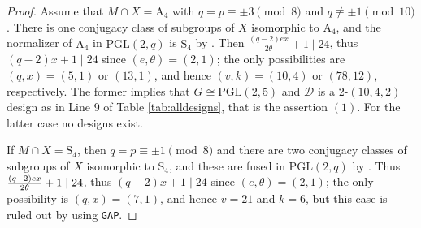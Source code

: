 \documentclass[a4paper,twopage,reqno,12pt]{amsart}
\theoremstyle{definition}
\numberwithin{equation}{section}
\newcommand{\PGL}{\mathrm{PGL}}
\newcommand{\A}{\mathrm{A}}
\renewcommand{\S}{\mathrm{S}}
\begin{document}
\begin{proof}
Assume that $M\cap X=\A_{4}$ with 
$q=p\equiv \pm 3\pmod{8}$ and $q\not\equiv \pm 1%
\pmod{10}$. There is one conjugacy class of subgroups of $X$ isomorphic to $\A_{4}$, and the normalizer of $\A_{4}$ in $\PGL(2,q)$ is $\S_{4}$ by \cite[§ 257]{Di}. Then $\frac{\left( q-2\right) ex%
}{2\theta }+1\mid 24$, thus $\left( q-2\right) x+1\mid 24$ since $(e,\theta)=(2,1)$; the only possibilities are $(q,x)=(5,1)$ or $(13,1)$, and hence $(v,k)=(10,4)$ or $(78,12)$, respectively. The former implies that $G\cong \PGL(2,5)$ and $\mathcal{D}$ is a $2$-$(10,4,2)$ design as in Line 9 of Table \ref{tab:alldesigns}, that is the assertion $(1)$. For the latter case no designs exist.

If $M\cap X=\S_{4}$, then $q=p\equiv \pm 1\pmod{8}$ and there are
two conjugacy classes of subgroups of $X$ isomorphic to $\S_{4}$, and these are fused in $\PGL(2,q)$ by \cite[§ 257]{Di}. Thus $\frac{\left( q-2\right) ex}{%
2\theta }+1\mid 24$, thus $\left( q-2\right) x+1\mid 24$ since $(e,\theta)=(2,1)$; the only possibility is $(q,x)=(7,1)$, and hence $v=21$ and $k=6$, but this case is ruled out by using \texttt{GAP}.

\end{proof}
\end{document}

